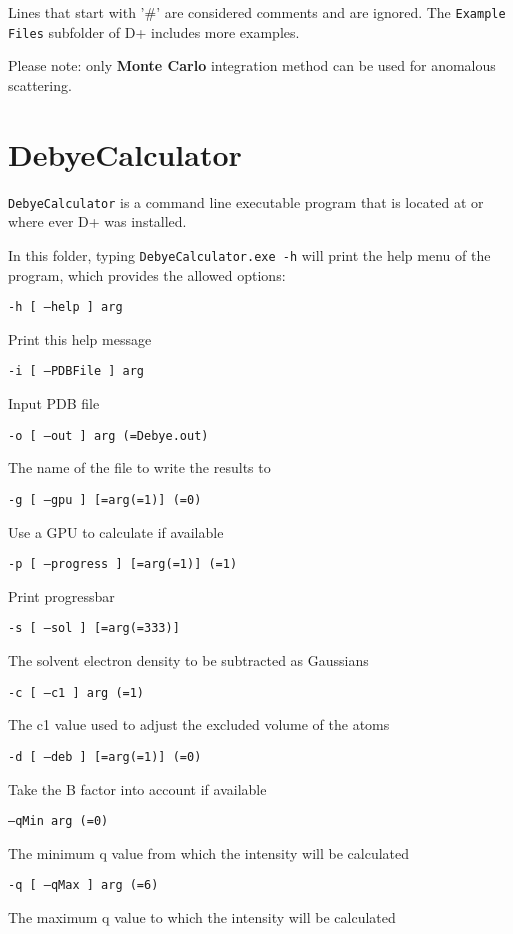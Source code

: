\documentclass[../D+Manual.tex]{subfiles}
\begin{document}
Lines that start with '\#' are considered comments and are ignored.
The \texttt{Example Files} subfolder of D+ includes more examples. 

Please note: only \textbf{Monte Carlo} integration method can be used for anomalous scattering. 


\section{DebyeCalculator}


\texttt{DebyeCalculator} is a command line executable program that is located at  or where ever D+ was installed.
 
In this folder, typing \texttt{DebyeCalculator.exe -h} will print the help menu of the program, which provides the allowed options:

\texttt{-h [ --help ] arg} 

Print this help message

\texttt{-i [ --PDBFile ] arg}

Input PDB file

\texttt{-o [ --out ] arg (=Debye.out)}

The name of the file to write the results to

\texttt{-g [ --gpu ] [=arg(=1)] (=0)}

Use a GPU to calculate if available

\texttt{-p [ --progress ] [=arg(=1)] (=1)}

Print progressbar

\texttt{-s [ --sol ] [=arg(=333)]} 

The solvent electron density to be subtracted as Gaussians

\texttt{-c [ --c1 ] arg (=1)}

The c1 value used to adjust the excluded volume of the atoms

\texttt{-d [ --deb ] [=arg(=1)] (=0)} 

Take the B factor into account if available

\texttt{--qMin arg (=0)}

The minimum q value from which the intensity will be calculated

\texttt{-q [ --qMax ] arg (=6)}

The maximum q value to which the intensity will be calculated
\end{document}
